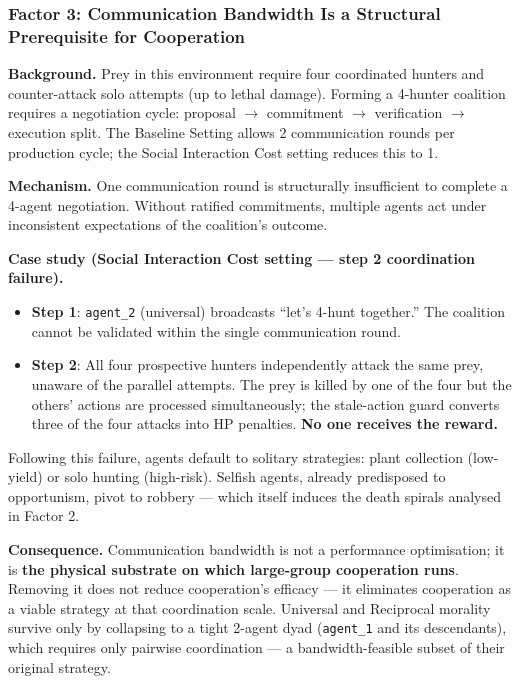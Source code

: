 \subsubsection{Factor 3: Communication Bandwidth Is a Structural Prerequisite for Cooperation}

\textbf{Background.} Prey in this environment require four coordinated hunters and counter-attack solo attempts (up to lethal damage). Forming a 4-hunter coalition requires a negotiation cycle: proposal $\to$ commitment $\to$ verification $\to$ execution split. The Baseline Setting allows 2 communication rounds per production cycle; the Social Interaction Cost setting reduces this to 1.

\textbf{Mechanism.} One communication round is structurally insufficient to complete a 4-agent negotiation. Without ratified commitments, multiple agents act under inconsistent expectations of the coalition's outcome.

\textbf{Case study (Social Interaction Cost setting --- step 2 coordination failure).}
\begin{itemize}
    \item \textbf{Step 1}: \texttt{agent\_2} (universal) broadcasts ``let's 4-hunt together.'' The coalition cannot be validated within the single communication round.
    \item \textbf{Step 2}: All four prospective hunters independently attack the same prey, unaware of the parallel attempts. The prey is killed by one of the four but the others' actions are processed simultaneously; the stale-action guard converts three of the four attacks into HP penalties. \textbf{No one receives the reward.}
\end{itemize}
Following this failure, agents default to solitary strategies: plant collection (low-yield) or solo hunting (high-risk). Selfish agents, already predisposed to opportunism, pivot to robbery --- which itself induces the death spirals analysed in Factor 2.

\textbf{Consequence.} Communication bandwidth is not a performance optimisation; it is \textbf{the physical substrate on which large-group cooperation runs}. Removing it does not reduce cooperation's efficacy --- it eliminates cooperation as a viable strategy at that coordination scale. Universal and Reciprocal morality survive only by collapsing to a tight 2-agent dyad (\texttt{agent\_1} and its descendants), which requires only pairwise coordination --- a bandwidth-feasible subset of their original strategy.

